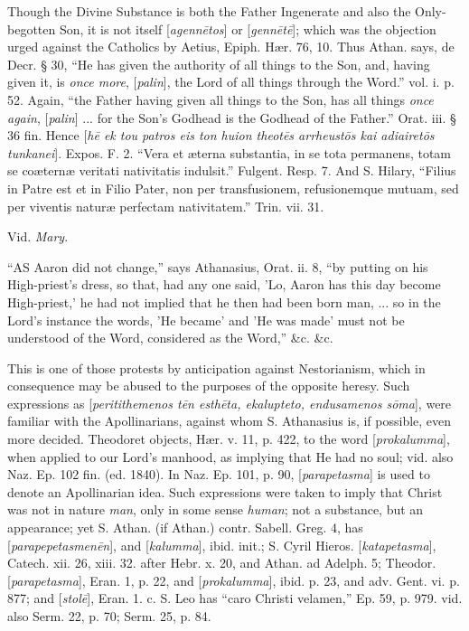 Though the Divine Substance is both the Father
Ingenerate and also the Only-begotten Son, it is not itself [\emph{agenn\={e}tos}]
or [\emph{genn\={e}t\={e}}]; which was the objection urged
against the Catholics by Aetius, Epiph. Hær. 76, 10. Thus Athan.
says, de Decr. § 30, ``He has given the authority of all things to the
Son, and, having given it, is \emph{once more}, [\emph{palin}],
the Lord of all things through the Word.'' vol. i. p. 52. Again, ``the
Father having given all things to the Son, has all things \emph{once
again}, [\emph{palin}] ... for the Son's Godhead is the Godhead of
the Father.'' Orat. iii. § 36 fin. Hence [\emph{h\={e} ek tou patros
eis ton huion theot\={e}s arrheust\={o}s kai adiairet\={o}s
tunkanei}]. Expos. F. 2. ``Vera et æterna substantia, in se tota
permanens, totam se coæternæ veritati nativitatis indulsit.''
Fulgent. Resp. 7. And S. Hilary, ``Filius in Patre est et in Filio
Pater, non per transfusionem, refusionemque mutuam, sed per viventis
naturæ perfectam nativitatem.'' Trin. vii. 31.

\xsection{[Theotokos]}

Vid. \emph{Mary}.

\xsection{[Katapetasma]}

``AS
Aaron did not change,'' says Athanasius, Orat. ii. 8, ``by putting on
his High-priest's dress, so that, had any one said, 'Lo, Aaron has
this day become High-priest,' he had not implied that he then had been
born man, ... so in the Lord's instance the words, 'He became' and 'He
was made' must not be understood of the Word, considered as the Word,''
\&c. \&c.

This is one of those protests by anticipation
against Nestorianism, which in consequence may be abused to the
purposes of the opposite heresy. Such expressions as [\emph{peritithemenos
t\={e}n esth\={e}ta, ekalupteto, endusamenos s\={o}ma}],
were familiar with the Apollinarians, against whom S. Athanasius is,
if possible, even more decided. Theodoret objects, Hær. v. 11, p.
422, to the word [\emph{prokalumma}], when applied to our Lord's
manhood, as implying that He had no soul; vid. also Naz. Ep. 102 fin.
(ed. 1840). In Naz. Ep. 101, p. 90, [\emph{parapetasma}] is used to
denote an Apollinarian idea. Such expressions were taken to imply that
Christ was not in nature \emph{man}, only in some sense \emph{human};
not a substance, but an appearance; yet S. Athan. (if Athan.) contr.
Sabell. Greg. 4, has [\emph{parapepetasmen\={e}n}], and [\emph{kalumma}],
ibid. init.; S. Cyril Hieros. [\emph{katapetasma}], Catech. xii. 26,
xiii. 32. after Hebr. x. 20, and Athan. ad Adelph. 5; Theodor. [\emph{parapetasma}],
Eran. 1, p. 22, and [\emph{prokalumma}], ibid. p. 23, and adv. Gent.
vi. p. 877; and [\emph{stol\={e}}], Eran. 1. c. S. Leo has ``caro
Christi velamen,'' Ep. 59, p. 979. vid. also Serm. 22, p. 70; Serm. 25,
p. 84.

